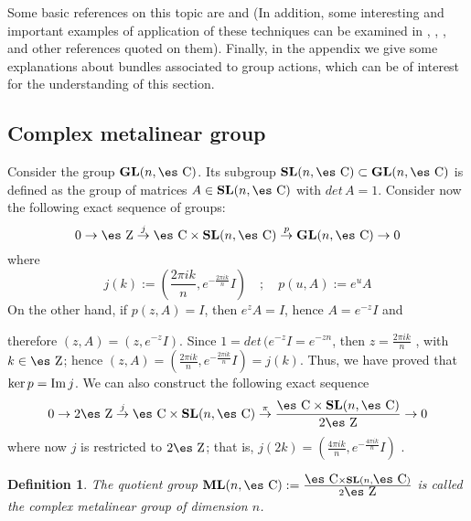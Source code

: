 \documentclass[12pt]{article}
\theoremstyle{plain}
\newtheorem{definition}{Definition}
\def\beq{\begin{equation}}
\def\eeq{\end{equation}}
\def\dst{\(}
\def\map#1{\mathrel{\mathop{\to}\limits^{#1}}}
\def\GL{{\bf GL}(n,\Complex )}
\def\SL{{\bf SL}(n,\Complex )}
\def\ML{{\bf ML}(n,\Complex )}
\def\Zahl{\mbox{\es Z}}
\def\Complex{\mbox{\es C}}
\begin{document}
Some basic references on this topic are \cite{Ga-83} and \cite{Wo-80}
(In addition, some interesting and important examples of application of
these techniques
can be examined in \cite{Sn-80}, \cite{Tu-85}, \cite{Wo-80},
and other references quoted on them).
Finally, in the appendix we give some explanations about bundles
associated to
group actions, which can be of interest for the understanding of this
section.



\subsection{Complex metalinear group}


Consider the group $\GL$. Its subgroup $\SL \subset \GL$
is defined as the group of matrices $A \in \SL$  with $det\, A = 1$.
Consider now the following exact sequence of groups:
\beq
0 \map{} \Zahl \map{j} \Complex \times \SL \map{p} \GL \map{} 0
\label{es1}
\eeq
where
$$
j(k) := \left(\frac{2\pi i k}{n},e^{-\frac{2\pi i k}{n}}I\right)
\quad ; \quad
p(u,A) := e^{u}A
$$
On the other hand, if $p(z,A)=I$, then $e^{z}A=I$, hence $A=e^{-z}I$ and

therefore
$(z,A)=(z,e^{-z}I)$. Since $1=det\, (e^{-z}I=e^{-zn}$, then \dst
z=\frac{2\pi i k}{n}\) ,
with $k \in \Zahl$; hence $(z,A)=(\frac{2\pi i k}{n},e^{-\frac{2\pi i
k}{n}}I)= j(k)$.
Thus, we have proved that $\ker p = {\rm Im}\, j$.
We can also construct the following exact sequence
\beq
0 \map{} 2\Zahl \map{j} \Complex \times \SL \map{\pi}
\frac{\Complex \times \SL}{2\Zahl} \map{} 0
\label{es2}
\eeq
where now $j$ is restricted to $2\Zahl$; that is,
\dst j(2k) =\left(\frac{4\pi i k}{n},e^{-\frac{4\pi i k}{n}}I\right) \)
.

\begin{definition}
The quotient group \dst \ML :=\frac{\Complex \times \SL}{2\Zahl}\)
is called the {\rm complex metalinear group} of dimension $n$.
\end{definition}
\end{document}
